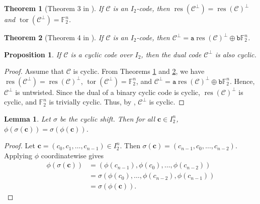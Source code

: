 \documentclass[12pt]{article}
\newtheorem{theorem}{Theorem}[section]
\newtheorem{lemma}[lemma]{Lemma}
\newtheorem{proposition}[proposition]{Proposition}
\theoremstyle{definition}
\theoremstyle{plain}
\newcommand{\Blue}[1]{{ \color{blue} #1}}
\begin{document}









\begin{theorem}[Theorem 3 in \cite{Duality_I2E2H2}]  \label{thm:resC and torC of Cdual}
If $\mathcal{C}$ is an $I_2$-code, then $\operatorname{res} ( \mathcal{C}^{\perp} ) = \operatorname{res} ( \mathcal{C} )^{\perp}$ and $\operatorname{tor}  ( \mathcal{C}^{\perp} ) = \mathbb{F}_{2}^{n}$.
\end{theorem}


\begin{theorem}[Theorem 4 in \cite{Duality_I2E2H2}]  \label{thm:Cdual as direct sum}
If $\mathcal{C}$ is an $I_2$-code, then $\mathcal{C}^\perp = \mathtt{a}  \operatorname{res} (\mathcal{C})^\perp  \oplus  \mathtt{b} \mathbb{F}_2^n$.
\end{theorem}



\begin{proposition}  \label{thm:dual-is-also-cyclic}
If $\mathcal{C}$ is a cyclic code over $I_2$, then the dual code $\mathcal{C}^\perp$ is also cyclic.
\end{proposition}

\begin{proof}
Assume that $\mathcal{C}$ is cyclic. From Theorems \ref{thm:resC and torC of Cdual} and \ref{thm:Cdual as direct sum}, we have $\operatorname{res}(\mathcal{C}^\perp) = \operatorname{res}(\mathcal{C})^\perp$, $\operatorname{tor}(\mathcal{C}^\perp) = \mathbb{F}_2^n$, and $\mathcal{C}^{\perp} = \mathtt{a}\operatorname{res}(\mathcal{C})^\perp \oplus \mathtt{b}\mathbb{F}_2^n$. Hence, $\mathcal{C}^\perp$ is untwisted. Since the dual of a binary cyclic code is cyclic, $\operatorname{res}(\mathcal{C})^\perp$ is cyclic, and $\mathbb{F}_2^n$ is trivially cyclic. Thus, by , $\mathcal{C}^\perp$ is cyclic.
\end{proof}




\begin{lemma}  \label{lem:phi-commutes}
Let $\sigma$ be the cyclic shift. Then for all $\mathbf{c} \in I_2^n$, $\phi (\sigma(\mathbf{c})) = \sigma (\phi (\mathbf{c}))$.
\end{lemma}


\begin{proof}
Let $\mathbf{c} = (c_0, c_1, \dots, c_{n-1}) \in I_2^n$. Then $\sigma(\mathbf{c}) = (c_{n-1},c_0,\dots,c_{n-2})$. Applying $\phi$ coordinatewise gives
\begin{align*}
\phi (\sigma(\mathbf{c}))
&= (\phi (c_{n-1}), \phi (c_0),\dots,\phi(c_{n-2}))  \\
&= \sigma (\phi(c_0),\dots,\phi(c_{n-2}),\phi(c_{n-1}))  \\
&= \sigma (\phi (\mathbf{c})).  \tag*{\qedhere}%
\end{align*}
\renewcommand{\qedsymbol}{}
\end{proof}
\end{document}
